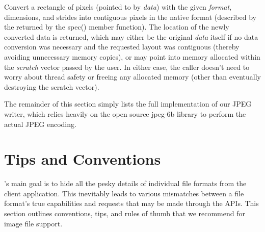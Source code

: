 \apiend


Convert a rectangle of pixels (pointed to by \emph{data}) with the given
\emph{format}, dimensions, and strides into contiguous pixels in the
native format (described by the \ImageSpec returned by the {\cf spec()}
member function).  The location of the newly converted data is returned,
which may either be the original \emph{data} itself if no data
conversion was necessary and the requested layout was contiguous
(thereby avoiding unnecessary memory copies), or may point into memory
allocated within the \emph{scratch} vector passed by the user.  In
either case, the caller doesn't need to worry about thread safety or
freeing any allocated memory (other than eventually destroying the
scratch vector).

\apiend

\bigskip
\bigskip

\noindent
The remainder of this section simply lists the full implementation of
our JPEG writer, which relies heavily on the open source {\fn jpeg-6b}
library to perform the actual JPEG encoding.



\section{Tips and Conventions}
\label{sec:plugintipsconventions}

\product's main goal is to hide all the pesky details of individual file
formats from the client application.  This inevitably leads to various
mismatches between a file format's true capabilities and requests that
may be made through the \product APIs.  This section outlines
conventions, tips, and rules of thumb that we recommend for image file
support.

